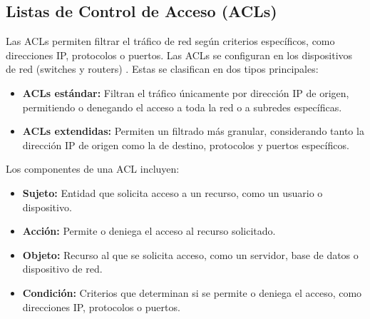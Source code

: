 \subsection{Listas de Control de Acceso (ACLs)}
\label{subsec:acl}
Las ACLs permiten filtrar el tráfico de red según criterios específicos, como direcciones IP, protocolos o puertos. Las ACLs se configuran en los dispositivos de red (switches y routers) \cite{cisco-hospital-design}. Estas se 
clasifican en dos tipos principales:

\begin{itemize}
    \item \textbf{ACLs estándar:} Filtran el tráfico únicamente por dirección IP de origen, permitiendo o denegando el acceso a toda la red o a subredes específicas.
    \item \textbf{ACLs extendidas:} Permiten un filtrado más granular, considerando tanto la dirección IP de origen como la de destino, protocolos y puertos específicos.
\end{itemize}

Los componentes de una ACL incluyen:
\begin{itemize}
    \item \textbf{Sujeto:} Entidad que solicita acceso a un recurso, como un usuario o dispositivo.
    \item \textbf{Acción:} Permite o deniega el acceso al recurso solicitado.
    \item \textbf{Objeto:} Recurso al que se solicita acceso, como un servidor, base de datos o dispositivo de red.
    \item \textbf{Condición:} Criterios que determinan si se permite o deniega el acceso, como direcciones IP, protocolos o puertos.
\end{itemize}

